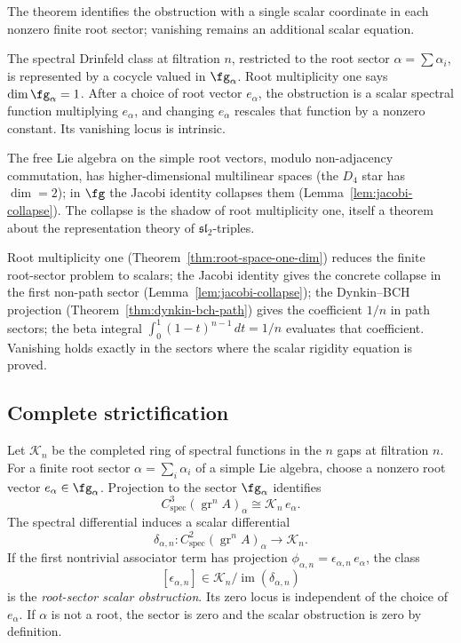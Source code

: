 \begin{remark}
\label{rem:root-mult-one-inevitability}
The theorem identifies the obstruction with a single scalar coordinate
in each nonzero finite root sector; vanishing remains an additional
scalar equation.

The spectral Drinfeld class at filtration $n$, restricted to the root
sector $\alpha=\sum\alpha_i$, is represented by a cocycle valued in
$\fg_\alpha$. Root multiplicity one says $\dim\fg_\alpha=1$. After a
choice of root vector $e_\alpha$, the obstruction is a scalar spectral
function multiplying $e_\alpha$, and changing $e_\alpha$ rescales that
function by a nonzero constant. Its vanishing locus is intrinsic.

The free Lie algebra on the simple root vectors, modulo non-adjacency
commutation, has higher-dimensional multilinear spaces (the $D_4$
star has $\dim=2$); in $\fg$ the Jacobi identity collapses them
(Lemma~\ref{lem:jacobi-collapse}). The collapse is the shadow of root
multiplicity one, itself a theorem about the representation theory of
$\mathfrak{sl}_2$-triples.

Root multiplicity one
(Theorem~\ref{thm:root-space-one-dim}) reduces the finite root-sector
problem to scalars; the Jacobi identity gives the concrete collapse in
the first non-path sector (Lemma~\ref{lem:jacobi-collapse}); the
Dynkin--BCH projection (Theorem~\ref{thm:dynkin-bch-path}) gives the
coefficient $1/n$ in path sectors; the beta integral
$\int_0^1(1-t)^{n-1}\,dt = 1/n$ evaluates that coefficient. Vanishing
holds exactly in the sectors where the scalar rigidity equation is
proved.
\end{remark}

\subsection{Complete strictification}

\begin{definition}
\label{def:root-sector-scalar-obstruction}
Let $\mathscr K_n$ be the completed ring of spectral functions in the
$n$ gaps at filtration $n$. For a finite root sector
$\alpha=\sum_i\alpha_i$ of a simple Lie algebra, choose a nonzero
root vector $e_\alpha\in\fg_\alpha$. Projection to the sector
$\fg_\alpha$ identifies
\[
C^3_{\mathrm{spec}}(\operatorname{gr}^nA)_\alpha
\cong \mathscr K_n\,e_\alpha .
\]
The spectral differential induces a scalar differential
\[
\delta_{\alpha,n}\colon
C^2_{\mathrm{spec}}(\operatorname{gr}^nA)_\alpha
\longrightarrow \mathscr K_n .
\]
If the first nontrivial associator term has projection
$\phi_{\alpha,n}=\epsilon_{\alpha,n}\,e_\alpha$, the class
\[
[\epsilon_{\alpha,n}]
\in
\mathscr K_n/\operatorname{im}(\delta_{\alpha,n})
\]
is the \emph{root-sector scalar obstruction}. Its zero locus is
independent of the choice of $e_\alpha$. If $\alpha$ is not a root, the
sector is zero and the scalar obstruction is zero by definition.
\end{definition}

